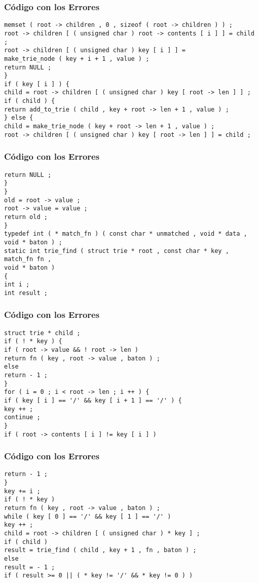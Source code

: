 \documentclass{beamer}
\begin{document}
\begin{frame}[fragile]
\frametitle{C\'odigo con los Errores}
\begin{verbatim}
memset ( root -> children , 0 , sizeof ( root -> children ) ) ; 
root -> children [ ( unsigned char ) root -> contents [ i ] ] = child ; 
root -> children [ ( unsigned char ) key [ i ] ] = 
make_trie_node ( key + i + 1 , value ) ; 
return NULL ; 
} 
if ( key [ i ] ) { 
child = root -> children [ ( unsigned char ) key [ root -> len ] ] ; 
if ( child ) { 
return add_to_trie ( child , key + root -> len + 1 , value ) ; 
} else { 
child = make_trie_node ( key + root -> len + 1 , value ) ; 
root -> children [ ( unsigned char ) key [ root -> len ] ] = child ; 
\end{verbatim}
\end{frame}
\begin{frame}[fragile]
\frametitle{C\'odigo con los Errores}
\begin{verbatim}
return NULL ; 
} 
} 
old = root -> value ; 
root -> value = value ; 
return old ; 
} 
typedef int ( * match_fn ) ( const char * unmatched , void * data , void * baton ) ; 
static int trie_find ( struct trie * root , const char * key , match_fn fn , 
void * baton ) 
{ 
int i ; 
int result ; 
\end{verbatim}
\end{frame}
\begin{frame}[fragile]
\frametitle{C\'odigo con los Errores}
\begin{verbatim}
struct trie * child ; 
if ( ! * key ) { 
if ( root -> value && ! root -> len ) 
return fn ( key , root -> value , baton ) ; 
else 
return - 1 ; 
} 
for ( i = 0 ; i < root -> len ; i ++ ) { 
if ( key [ i ] == '/' && key [ i + 1 ] == '/' ) { 
key ++ ; 
continue ; 
} 
if ( root -> contents [ i ] != key [ i ] ) 
\end{verbatim}
\end{frame}
\begin{frame}[fragile]
\frametitle{C\'odigo con los Errores}
\begin{verbatim}
return - 1 ; 
} 
key += i ; 
if ( ! * key ) 
return fn ( key , root -> value , baton ) ; 
while ( key [ 0 ] == '/' && key [ 1 ] == '/' ) 
key ++ ; 
child = root -> children [ ( unsigned char ) * key ] ; 
if ( child ) 
result = trie_find ( child , key + 1 , fn , baton ) ; 
else 
result = - 1 ; 
if ( result >= 0 || ( * key != '/' && * key != 0 ) ) 
\end{verbatim}
\end{frame}
\end{document}
